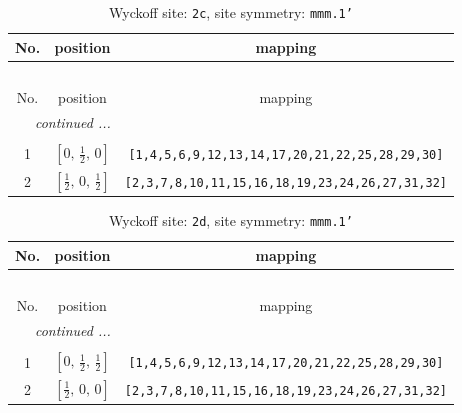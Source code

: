 \documentclass[fleqn,8pt]{jsarticle}
\begin{document}
\renewcommand{\arraystretch}{1.2}
\begin{longtable}{ccc}
\caption{Wyckoff site: {\tt 2c}, site symmetry: {\tt mmm.1'}}
 \\
 \hline \hline
No. & position & mapping \\ \hline \endfirsthead

\multicolumn{2}{l}{\tablename\ \thetable{}} \\
 \hline \hline
No. & position & mapping \\ \hline \endhead

 \hline \hline
\multicolumn{2}{r}{\footnotesize\it continued ...} \\ \endfoot

 \hline \hline
\multicolumn{2}{r}{} \\ \endlastfoot

1 & $\left[ 0,\, \frac{1}{2},\, 0 \right]$ & {\tt [1,4,5,6,9,12,13,14,17,20,21,22,25,28,29,30]} \\ \hline
2 & $\left[ \frac{1}{2},\, 0,\, \frac{1}{2} \right]$ & {\tt [2,3,7,8,10,11,15,16,18,19,23,24,26,27,31,32]} \\
\end{longtable}
\renewcommand{\arraystretch}{1.2}
\begin{longtable}{ccc}
\caption{Wyckoff site: {\tt 2d}, site symmetry: {\tt mmm.1'}}
 \\
 \hline \hline
No. & position & mapping \\ \hline \endfirsthead

\multicolumn{2}{l}{\tablename\ \thetable{}} \\
 \hline \hline
No. & position & mapping \\ \hline \endhead

 \hline \hline
\multicolumn{2}{r}{\footnotesize\it continued ...} \\ \endfoot

 \hline \hline
\multicolumn{2}{r}{} \\ \endlastfoot

1 & $\left[ 0,\, \frac{1}{2},\, \frac{1}{2} \right]$ & {\tt [1,4,5,6,9,12,13,14,17,20,21,22,25,28,29,30]} \\ \hline
2 & $\left[ \frac{1}{2},\, 0,\, 0 \right]$ & {\tt [2,3,7,8,10,11,15,16,18,19,23,24,26,27,31,32]} \\
\end{longtable}
\renewcommand{\arraystretch}{1.2}
\end{document}

